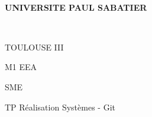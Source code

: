 \pagestyle{empty}
~
\vspace{2cm}
\begin{center}
    \textbf{\LARGE{UNIVERSITE PAUL SABATIER}}
\end{center}

~

\begin{center}
    \LARGE{TOULOUSE III}
\end{center}

\vspace{2cm}

\begin{center}
    \Huge{M1 EEA}
\end{center}

\begin{center}
    \Huge{SME}
\end{center}

\vspace{4cm}

\begin{center}
    \LARGE{TP Réalisation Systèmes - Git}
\end{center}